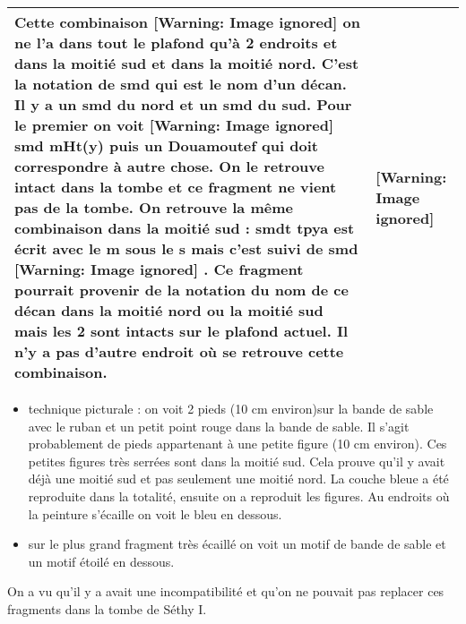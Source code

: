\documentclass{article}
\begin{document}
\begin{flushleft}
\tablehead{}
\begin{supertabular}{|m{8.872cm}|m{4.5080004cm}|}
\hline
Cette combinaison    [Warning: Image ignored]
   on ne l’a dans tout le plafond qu’à 2 endroits et dans la moitié sud
et dans la moitié nord. C’est la notation de smd qui est le nom d’un
décan. Il y a un smd du nord et un smd du sud. Pour le premier on voit 
 [Warning: Image ignored] %
   smd mHt(y) puis un Douamoutef qui doit correspondre à autre chose. 
On le retrouve intact dans la tombe et ce fragment ne vient pas de la
tombe. On retrouve la même combinaison dans la moitié sud : smdt tpya 
est écrit avec le m sous le s mais c’est suivi de smd   [Warning: Image
ignored] %
  . Ce fragment pourrait provenir de la notation du nom de ce décan dans
la moitié nord ou la moitié sud mais les 2 sont intacts sur le plafond
actuel. Il n’y a pas d’autre endroit où se retrouve cette combinaison.

 &
  [Warning: Image ignored] %
 \\\hline
\end{supertabular}
\end{flushleft}
\begin{itemize}
\item technique picturale : on voit 2 pieds (10 cm environ)sur la bande
de sable avec le ruban et un petit point rouge dans la bande de sable.
Il s’agit probablement de pieds appartenant à une petite figure (10 cm
environ). Ces petites figures très serrées sont dans la moitié sud.
Cela prouve qu’il y avait déjà une moitié sud et pas seulement une
moitié nord. La couche bleue a été reproduite dans la totalité, ensuite
on a reproduit les figures. Au endroits où la peinture s’écaille on
voit le bleu en dessous.
\end{itemize}
\begin{itemize}
\item  sur le plus grand fragment très écaillé on voit un motif de bande
de sable et un motif étoilé en dessous.
\end{itemize}
On a vu qu’il y a avait une incompatibilité et qu’on ne pouvait pas
replacer ces fragments dans la tombe de Séthy I. 
\end{document}
